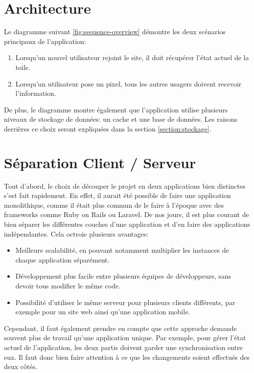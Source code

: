 \section{Architecture}

Le diagramme suivant \ref{fig:sequence-overview} démontre les deux scénarios principaux de l'application:

\begin{enumerate}
  \item Lorsqu'un nouvel utilisateur rejoint le site, il doit récupérer l'état actuel de la toile.
  \item Lorsqu'un utilisateur pose un pixel, tous les autres usagers doivent recevoir l'information.
\end{enumerate}

De plus, le diagramme montre également que l'application utilise plusieurs niveaux de stockage de données: un cache et une base de données. Les raisons derrières ce choix seront expliquées dans la section \ref{section:stockage}.

\label{fig:sequence-overview}

\section{Séparation Client / Serveur}

Tout d'abord, le choix de découper le projet en deux applications bien distinctes s'est fait rapidement. En effet, il aurait été possible de faire une application monolithique, comme il était plus commun de le faire à l'époque avec des frameworks comme Ruby on Rails ou Laravel. De nos jours, il est plus courant de bien séparer les différentes couches d'une application et d'en faire des applications indépendantes. Cela octroie plusieurs avantages:

\begin{itemize}
  \item Meilleure scalabilité, en pouvant notamment multiplier les instances de chaque application séparément.
  \item Développement plus facile entre plusieurs équipes de développeurs, sans devoir tous modifier le même code.
  \item Possibilité d'utiliser le même serveur pour plusieurs clients différents, par exemple pour un site web ainsi qu'une application mobile.
\end{itemize}

Cependant, il faut également prendre en compte que cette approche demande souvent plus de travail qu'une application unique. Par exemple, pour gérer l'état actuel de l'application, les deux partis doivent garder une synchronisation entre eux. Il faut donc bien faire attention à ce que les changements soient effectués des deux côtés.
